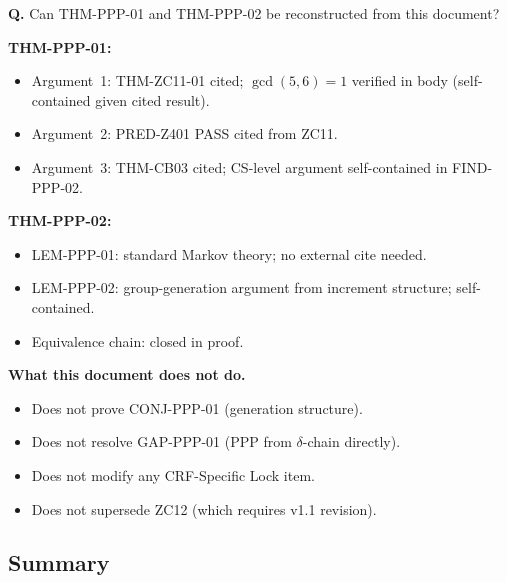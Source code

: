 \documentclass[12pt, a4paper]{article}
\begin{document}
\begin{formalbox}[title={Reconstruction Test (CUIP No-Loss)}]
\textbf{Q.} Can THM-PPP-01 and THM-PPP-02 be reconstructed from
this document?

\textbf{THM-PPP-01:}
\begin{itemize}[leftmargin=*, noitemsep]
  \item Argument~1: THM-ZC11-01 cited; $\gcd(5,6)=1$ verified
    in body (self-contained given cited result).
  \item Argument~2: PRED-Z401 PASS cited from ZC11.
  \item Argument~3: THM-CB03 cited; CS-level argument self-contained
    in FIND-PPP-02. \checkmark
\end{itemize}

\textbf{THM-PPP-02:}
\begin{itemize}[leftmargin=*, noitemsep]
  \item LEM-PPP-01: standard Markov theory; no external cite needed.
  \item LEM-PPP-02: group-generation argument from increment
    structure; self-contained.
  \item Equivalence chain: closed in proof. \checkmark
\end{itemize}

\textbf{What this document does not do.}
\begin{itemize}[leftmargin=*, noitemsep]
  \item Does not prove CONJ-PPP-01 (generation structure).
  \item Does not resolve GAP-PPP-01 (PPP from $\delta$-chain directly).
  \item Does not modify any CRF-Specific Lock item.
  \item Does not supersede ZC12 (which requires v1.1 revision).
\end{itemize}
\end{formalbox}

\subsection{Summary}
\label{sec:summary}
\end{document}
